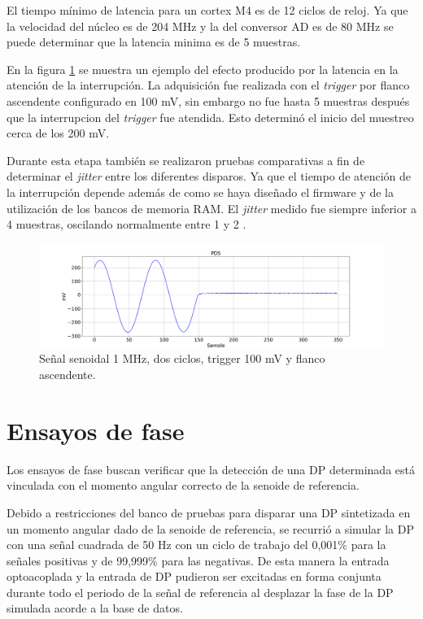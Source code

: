 \newpage

El tiempo mínimo de latencia para un cortex M4 es de 12 ciclos de reloj. Ya que la velocidad del núcleo es de 204 MHz y la del conversor AD es de 80 MHz se puede determinar que la latencia minima es de 5 muestras. 

En la figura \ref{fig:tiempoInicial} se muestra un ejemplo del efecto producido por la latencia en la atención de la interrupción. La adquisición fue realizada con el \textit{trigger} por flanco ascendente configurado en 100 mV, sin embargo no fue hasta 5 muestras después que la interrupcion del \textit{trigger} fue atendida. Esto determinó el inicio del muestreo cerca de los 200 mV.

Durante esta etapa también se realizaron pruebas comparativas a fin de determinar el \textit{jitter} entre los diferentes disparos. Ya que el tiempo de atención de la interrupción depende además de como se haya diseñado el firmware y de la utilización de los bancos de memoria RAM. El \textit{jitter} medido fue siempre inferior a 4 muestras, oscilando normalmente entre 1 y 2 .

\begin{figure}[htpb]
	\hspace{-1.2cm}
	\includegraphics[width=165mm]{./Figures/tiempoInicial.png}
	\caption{Señal senoidal 1 MHz, dos ciclos, trigger 100 mV y flanco ascendente.}
	\label{fig:tiempoInicial}
\end{figure}


\section{Ensayos de fase}

Los ensayos de fase buscan verificar que la detección de una DP determinada está vinculada con el momento angular correcto de la senoide de referencia.

Debido a restricciones del banco de pruebas para disparar una DP sintetizada en un momento angular dado de la senoide de referencia, se recurrió a simular la DP con una señal cuadrada de 50 Hz con un ciclo de trabajo del 0,001\% para la señales positivas y de 99,999\% para las negativas. De esta manera la entrada optoacoplada y la entrada de DP pudieron ser excitadas en forma conjunta durante todo el periodo de la señal de referencia al desplazar la fase de la DP simulada acorde a la base de datos.

